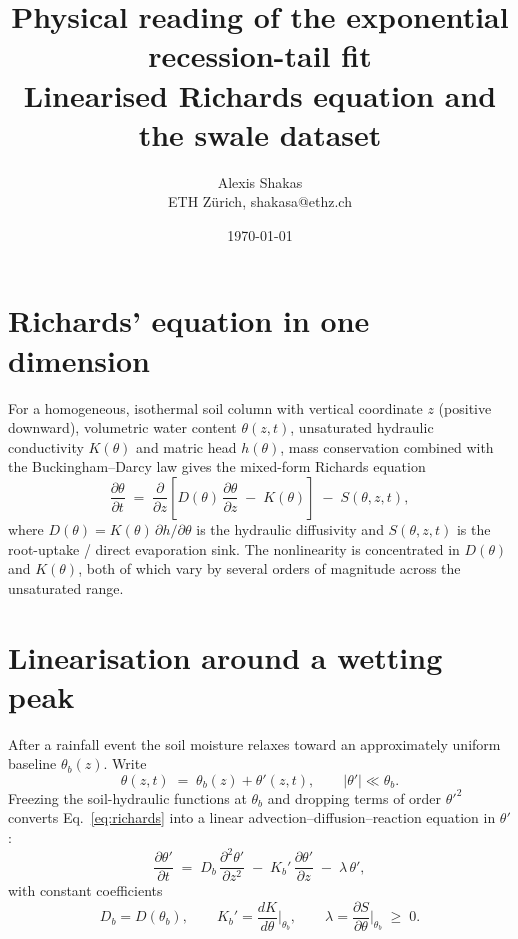 \documentclass[11pt]{article}
\title{Physical reading of the exponential recession-tail fit\\
       \large Linearised Richards equation and the swale dataset}
\author{Alexis Shakas \\ \small{ETH Z\"urich, shakasa@ethz.ch}}
\date{\today}
\newcommand{\dpartial}[2]{\frac{\partial #1}{\partial #2}}
\begin{document}
\maketitle

\section{Richards' equation in one dimension}

For a homogeneous, isothermal soil column with vertical coordinate $z$
(positive downward), volumetric water content $\theta(z,t)$,
unsaturated hydraulic conductivity $K(\theta)$ and matric head
$h(\theta)$, mass conservation combined with the Buckingham--Darcy law
gives the mixed-form Richards equation
\begin{equation}
    \dpartial{\theta}{t}
    \;=\;
    \dpartial{}{z}\!\left[
        D(\theta)\,\dpartial{\theta}{z} \;-\; K(\theta)
    \right]
    \;-\;
    S(\theta,z,t),
    \label{eq:richards}
\end{equation}
where $D(\theta) = K(\theta)\,\partial h/\partial\theta$ is the
hydraulic diffusivity and $S(\theta,z,t)$ is the root-uptake / direct
evaporation sink. The nonlinearity is concentrated in $D(\theta)$ and
$K(\theta)$, both of which vary by several orders of magnitude across
the unsaturated range.

\section{Linearisation around a wetting peak}

After a rainfall event the soil moisture relaxes toward an
approximately uniform baseline $\theta_b(z)$. Write
\begin{equation}
    \theta(z,t) \;=\; \theta_b(z) + \theta'(z,t),
    \qquad
    |\theta'| \ll \theta_b.
\end{equation}
Freezing the soil-hydraulic functions at $\theta_b$ and dropping terms
of order $\theta'^2$ converts Eq.~\eqref{eq:richards} into a
linear advection--diffusion--reaction equation in $\theta'$:
\begin{equation}
    \dpartial{\theta'}{t}
    \;=\;
    D_b\,\dpartial{^2\theta'}{z^2}
    \;-\;
    K_b'\,\dpartial{\theta'}{z}
    \;-\;
    \lambda\,\theta',
    \label{eq:linrichards}
\end{equation}
with constant coefficients
\begin{equation}
    D_b = D(\theta_b),
    \qquad
    K_b' = \frac{dK}{d\theta}\bigg|_{\theta_b},
    \qquad
    \lambda = \frac{\partial S}{\partial\theta}\bigg|_{\theta_b} \;\ge\; 0.
\end{equation}
\end{document}
